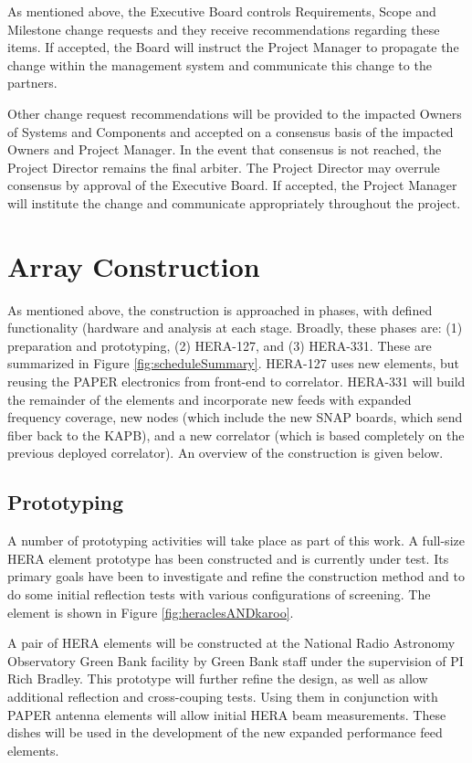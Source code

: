 \documentclass[preprint]{aastex}
\begin{document}
As mentioned above, the Executive Board controls Requirements, Scope and Milestone change requests
and they receive recommendations regarding these items.  If accepted, the Board will instruct the Project Manager to 
propagate the change within the management system and communicate this change to the partners.

Other change request recommendations will be provided to the impacted Owners of Systems and
Components and accepted on a consensus basis of the impacted Owners and Project Manager.  
In the event that consensus is not reached, the Project Director remains the final arbiter.  The Project 
Director may overrule consensus by approval of the Executive Board.  If accepted, the Project Manager 
will institute the change and communicate appropriately throughout the project.

\section{Array Construction}
\label{sec:construction}
As mentioned above, the construction is approached in phases, with defined functionality (hardware 
and analysis at each stage.  Broadly, these phases are:  (1) preparation and prototyping, (2) HERA-127, 
and (3) HERA-331.  These are summarized in Figure \ref{fig:scheduleSummary}.   HERA-127 uses new
elements, but reusing the PAPER electronics from front-end to correlator.  HERA-331 will build the 
remainder of the elements and incorporate new feeds with expanded frequency coverage, new nodes
(which include the new SNAP boards, which send fiber back to the KAPB), and a new correlator (which
is based completely on the previous deployed correlator).
An overview of the construction is given below.

\subsection{Prototyping}
A number of prototyping activities will take place as part of this work.  A full-size HERA element prototype has been
constructed and is currently under test.  Its primary goals have been to investigate and refine the construction
method and to do some initial reflection tests with various configurations of screening.  The element is shown in
Figure \ref{fig:heraclesANDkaroo}.

A pair of HERA elements will be constructed at the National Radio Astronomy Observatory Green Bank
facility by Green Bank staff under the supervision of PI Rich Bradley.  This prototype will further refine
the design, as well as allow additional reflection and cross-couping tests.  Using them in conjunction 
with PAPER antenna elements will allow initial HERA beam measurements.  These dishes will be used
in the development of the new expanded performance feed elements.
\end{document}
